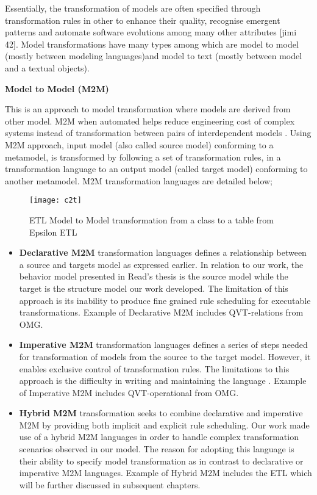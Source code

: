 \documentclass[12pt, a4paper]{report}
\begin{document}
Essentially, the transformation of models are often specified through transformation rules in other to enhance their quality, recognise emergent patterns and automate software evolutions among many other attributes [jimi 42]. Model transformations have many types among which are model to model (mostly between modeling languages)and model to text (mostly between model and a textual objects).

\textbf{Model to Model (M2M)}

This is an approach to model transformation where models are derived from other model. M2M when automated helps reduce engineering cost of complex systems instead of transformation between pairs of interdependent models \cite{Sendall2003}. Using M2M approach, input model (also called source model) conforming to a metamodel, is transformed by following a set of transformation rules, in a transformation language to an output model (called target model) conforming to another metamodel. M2M transformation languages are detailed below;

\begin{figure}[!ht]
  \centering
   \texttt{[image: c2t]}
  \caption{ETL Model to Model transformation from a class to a table from Epsilon ETL}
  \label{fig:mrad}
\end{figure}

\begin{itemize}

\item \textbf{Declarative M2M} transformation languages defines a relationship between a source and targets model as expressed earlier. In relation to our work, the behavior model presented in Read's thesis \cite{Read2011} is the source model while the target is the structure model our work developed. The limitation of this approach is its inability to produce fine grained rule scheduling for executable transformations. Example of Declarative M2M includes QVT-relations from OMG.

\item \textbf{Imperative M2M} transformation languages defines a series of steps needed for transformation of models from the source to the target model. However, it enables exclusive control of transformation rules. The limitations to this approach is the difficulty in writing and maintaining the language \cite{Kolovos2009}. Example of Imperative M2M includes QVT-operational from OMG.

\item \textbf{Hybrid M2M} transformation seeks to combine declarative and imperative M2M by providing both implicit and explicit rule scheduling. Our work made use of a hybrid M2M languages in order to handle complex transformation scenarios observed in our model. The reason for adopting this language is their ability to specify model transformation as in contrast to declarative or imperative M2M languages. Example of Hybrid M2M includes the ETL which will be further discussed in subsequent chapters.

\end{itemize}
\end{document}
